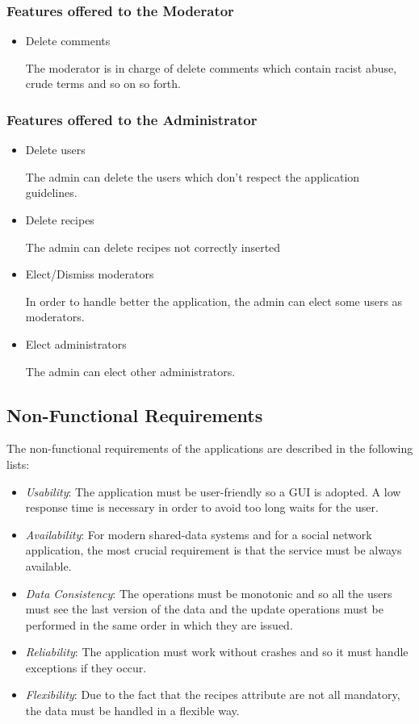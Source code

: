 \documentclass[a4paper]{report}
\begin{document}
\subsubsection{Features offered to the Moderator}
\begin{itemize}
	\item Delete comments
	
	\noindent The moderator is in charge of delete comments which contain racist abuse, crude terms and so on so forth.
\end{itemize}

\subsubsection{Features offered to the Administrator}
\begin{itemize}
	\item Delete users
	
	\noindent The admin can delete the users which don't respect the application guidelines.
	
	\item Delete recipes
	
	\noindent The admin can delete recipes not correctly inserted
	
	\item Elect/Dismiss moderators
	
	\noindent In order to handle better the application, the admin can elect some users as moderators.
	
	\item Elect administrators
	
	\noindent The admin can elect other administrators.
\end{itemize}
\subsection{Non-Functional Requirements}
The non-functional requirements of the applications are described in the following lists:
\begin{itemize}
	\item \emph{Usability}: The application must be user-friendly so a GUI is adopted. A low response time is necessary in order to avoid too long waits for the user.
	\item \emph{Availability}: For modern shared-data systems and for a social network application, the most crucial requirement is that the service must be always available.

	\item \emph{Data Consistency}: The operations must be monotonic and so all the users must see the last version of the data and the update operations must be performed in the same order in which they are issued.

	\item \emph{Reliability}: The application must work without crashes and so it must handle exceptions if they occur.
	
	\item \emph{Flexibility}: Due to the fact that the recipes attribute are not all mandatory, the data must be handled in a flexible way.  
\end{itemize}
\newpage
\end{document}
